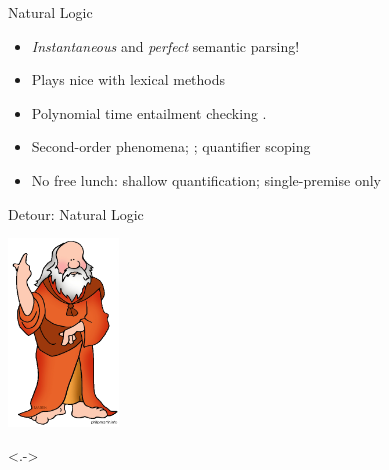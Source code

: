 \begin{frame}{Natural Logic}
\begin{center}
\end{center}
\vspace{1em}
\pause

\begin{itemize}
\item \textit{Instantaneous} and \textit{perfect} semantic parsing!
\item Plays nice with lexical methods
\end{itemize}
\vspace{1ex}
\pause

\begin{itemize}
\item Polynomial time entailment checking \cite{key:2008maccartney-natlog}.
\end{itemize}
\vspace{1ex}
\pause

\begin{itemize}
\item Second-order phenomena; ; quantifier scoping
\pause
\item No free lunch: shallow quantification; single-premise only
\end{itemize}
\end{frame}


\def\title{Detour: Natural Logic}
\begin{frame}{\title}
\begin{center}
  \includegraphics[height=5cm]{../img/aristotle.png}
\end{center}
\footnotetext<.->{\cite{key:1991valencia-natlog,key:2014icard-natlog}}
\end{frame}


